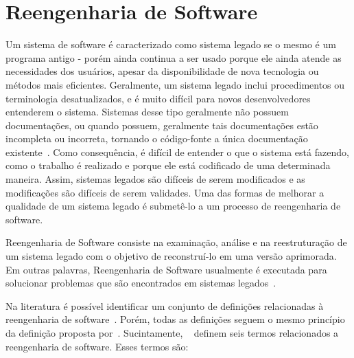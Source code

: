\section{Reengenharia de Software}\label{sec:reengenharia}

Um sistema de software é caracterizado como sistema legado se o mesmo é um programa antigo - porém ainda continua a ser usado porque ele ainda atende as necessidades dos usuários, apesar da disponibilidade de nova tecnologia ou métodos mais eficientes. Geralmente, um sistema legado inclui procedimentos ou terminologia desatualizados, e é muito difícil para novos desenvolvedores entenderem o sistema. Sistemas desse tipo geralmente não possuem documentações, ou quando possuem, geralmente tais documentações estão incompleta ou incorreta, tornando o código-fonte a única documentação existente~\cite{Postema_reverseengineering}. Como consequência, é difícil de entender o que o sistema está fazendo, como o trabalho é realizado e porque ele está codificado de uma determinada maneira. Assim, sistemas legados são difíceis de serem modificados e as modificações são difíceis de serem validades. Uma das formas de melhorar a qualidade de um sistema legado é submetê-lo a um processo de reengenharia de software.

Reengenharia de Software consiste na examinação, análise e na reestruturação de um sistema legado com o objetivo de reconstruí-lo em uma versão aprimorada. Em outras palavras, Reengenharia de Software usualmente é executada para solucionar problemas que são encontrados em sistemas legados~\cite{Yu_1991}.

Na literatura é possível identificar um conjunto de definições relacionadas à reengenharia de software~\cite{Byrne_1992, Chikofsky_cross, Pressman_2009, Sommerville_2006}. Porém, todas as definições seguem o mesmo princípio da definição proposta por~\cite{Chikofsky_cross}. Sucintamente, ~ definem seis termos relacionados a reengenharia de software. Esses termos são:

